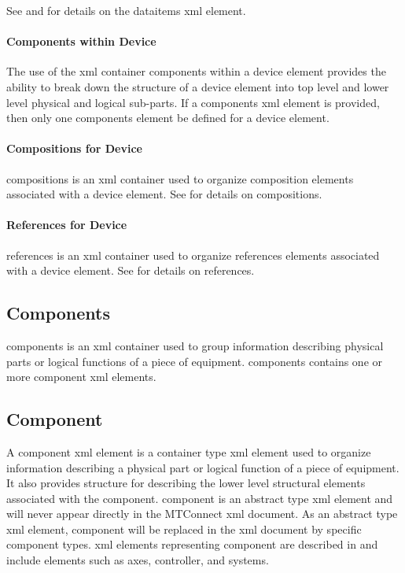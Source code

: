 See  and  for details on the \gls{dataitems} \gls{xml} element.

\paragraph{Components within Device}\mbox{}

The use of the \gls{xml} container \gls{components} within a \gls{device} element provides the ability to break down the structure of a \gls{device} element into \gls{top level} and \gls{lower level} physical and logical sub-parts.  If a \gls{components} \gls{xml} element is provided, then only one \gls{components} element \MUST be defined for a \gls{device} element.

\paragraph{Compositions for Device}\mbox{}

\gls{compositions} is an \gls{xml} container used to organize \gls{composition} elements associated with a \gls{device} element.  See  for details on \gls{compositions}.

\paragraph{References for Device}\mbox{}

\gls{references} is an \gls{xml} container used to organize \gls{references} elements associated with a \gls{device} element.  See  for details on \gls{references}.  

\subsection{Components}

\gls{components} is an \gls{xml} container used to group information describing physical parts or logical functions of a piece of equipment.   \gls{components} contains one or more \gls{component} \gls{xml} elements.



\subsection{Component}
\label{sec:Component}

A \gls{component} \gls{xml} element is a container type \gls{xml} element used to organize information describing a physical part or logical function of a piece of equipment.   It also provides structure for describing the \gls{lower level} \glspl{structural element} associated with the \gls{component}.     \gls{component} is an abstract type \gls{xml} element and will never appear directly in the MTConnect \gls{xml} document.  As an abstract type \gls{xml} element, \gls{component} will be replaced in the \gls{xml} document by specific \gls{component} types.  \gls{xml} elements representing \gls{component} are described in  and include elements such as \gls{axes}, \gls{controller}, and \gls{systems}.

